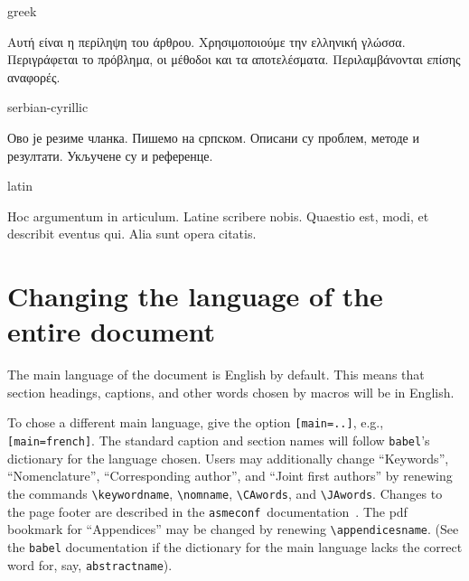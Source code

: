 \documentclass[colorlinks,nofoot,fontspec,spanish,japanese,russian,greek,ukrainian,vietnamese,french,portuguese,turkish,polish,indonesian,italian,german,latin,serbianc,bidi=basic]{asmeconf}
\newcommand*\AC{{\upshape\texttt{asmeconf}}}
\begin{document}
\begin{selectlanguage}{greek}%
\begin{abstract*}
Αυτή είναι η περίληψη του άρθρου. Χρησιμοποιούμε την ελληνική γλώσσα. Περιγράφεται το πρόβλημα, οι μέθοδοι και τα αποτελέσματα. Περιλαμβάνονται επίσης αναφορές.
\end{abstract*}
\end{selectlanguage}%

\begin{selectlanguage}{serbian-cyrillic}
\begin{abstract*}
Ово је резиме чланка. Пишемо на српском. Описани су проблем, методе и резултати. Укључене су и референце.
\end{abstract*}
\end{selectlanguage}%

{\NotoSerif
\begin{selectlanguage}{latin}
\begin{abstract*}
Hoc argumentum in articulum. Latine scribere nobis. Quaestio est, modi, et describit eventus qui. Alia sunt opera citatis.
\end{abstract*}
\end{selectlanguage}
}%

\section{Changing the language of the entire document}
The main language of the document is English  by default.  This means that section headings, captions, and other words chosen by macros will be in English. 

To chose a different main language, give the option \texttt{[main=..]}, e.g., \texttt{[main=french]}. The standard caption and section names will follow \texttt{babel}'s dictionary for the language chosen.  Users may additionally change ``Keywords'', ``Nomenclature'',  ``Corresponding author'', and ``Joint first authors'' by renewing the commands \verb|\keywordname|, \verb|\nomname|, \verb|\CAwords|, and \verb|\JAwords|. Changes to the page footer are described in the \AC\ documentation~\cite{lienhard2021}. The pdf bookmark for ``Appendices'' may be changed by renewing \verb|\appendicesname|. (See the \texttt{babel} documentation \cite[\S 1.15]{bezos2020} if the dictionary for the main language lacks the correct word for, say, \verb|abstractname|).
\end{document}
